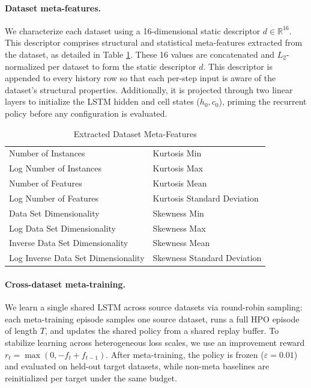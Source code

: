 \paragraph{Dataset meta-features.}
We characterize each dataset using a 16-dimensional static descriptor $d \in \mathbb{R}^{16}$. This descriptor comprises structural and statistical meta-features extracted from the dataset, as detailed in Table \ref{tab:meta_features}. These 16 values are concatenated and $L_2$-normalized per dataset to form the static descriptor $d$. This descriptor is appended to every history row so that each per-step input is aware of the dataset's structural properties. Additionally, it is projected through two linear layers to initialize the LSTM hidden and cell states ($h_0, c_0$), priming the recurrent policy before any configuration is evaluated.

\begin{table}[htbp]
\centering
\caption{Extracted Dataset Meta-Features}
\label{tab:meta_features}
\begin{tabular}{ll}
\toprule
Number of Instances & Kurtosis Min \\
Log Number of Instances & Kurtosis Max \\
Number of Features & Kurtosis Mean \\
Log Number of Features & Kurtosis Standard Deviation \\
Data Set Dimensionality & Skewness Min \\
Log Data Set Dimensionality & Skewness Max \\
Inverse Data Set Dimensionality & Skewness Mean \\
Log Inverse Data Set Dimensionality & Skewness Standard Deviation \\
\bottomrule
\end{tabular}
\end{table}

\paragraph{Cross-dataset meta-training.}
We learn a single shared LSTM across source datasets via round-robin sampling: 
each meta-training episode samples one source dataset, runs a full HPO episode 
of length $T$, and updates the shared policy from a shared replay buffer. To 
stabilize learning across heterogeneous loss scales, we use an improvement 
reward $r_t = \max(0, -f_t + f_{t-1})$. After meta-training, the policy is frozen ($\varepsilon=0.01$) and evaluated on held-out target datasets, while non-meta baselines are reinitialized per target under the same budget.